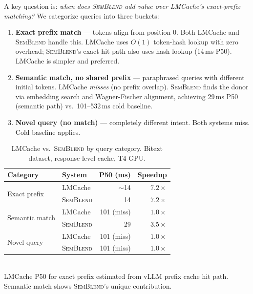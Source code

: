 \documentclass[11pt,twocolumn]{article}
\newcommand{\semblend}{\textsc{SemBlend}\xspace}
\begin{document}
A key question is: \emph{when does \semblend add value over LMCache's
exact-prefix matching?} We categorize queries into three buckets:

\begin{enumerate}[leftmargin=*,nosep]
\item \textbf{Exact prefix match} --- tokens align from position 0.
  Both LMCache and \semblend handle this. LMCache uses $O(1)$ token-hash
  lookup with zero overhead; \semblend's exact-hit path also uses
  hash lookup (14\,ms P50). LMCache is simpler and preferred.

\item \textbf{Semantic match, no shared prefix} --- paraphrased queries
  with different initial tokens. LMCache \emph{misses} (no prefix
  overlap). \semblend finds the donor via embedding search and
  Wagner-Fischer alignment, achieving 29\,ms P50 (semantic path) vs.\
  101--532\,ms cold baseline.

\item \textbf{Novel query (no match)} --- completely different intent.
  Both systems miss. Cold baseline applies.
\end{enumerate}

\begin{table}[t]
\centering
\caption{LMCache vs.\ \semblend by query category. Bitext dataset,
response-level cache, T4 GPU.}
\label{tab:lmcache}
\footnotesize
\setlength{\tabcolsep}{2.5pt}
\begin{tabular}{@{}llrr@{}}
\toprule
\textbf{Category} & \textbf{System} & \textbf{P50 (ms)} & \textbf{Speedup} \\
\midrule
\multirow{2}{*}{Exact prefix} & LMCache & $\sim$14 & $7.2\times$ \\
 & \semblend & 14 & $7.2\times$ \\
\midrule
\multirow{2}{*}{Semantic match} & LMCache & 101 (miss) & $1.0\times$ \\
 & \semblend & 29 & $3.5\times$ \\
\midrule
\multirow{2}{*}{Novel query} & LMCache & 101 (miss) & $1.0\times$ \\
 & \semblend & 101 (miss) & $1.0\times$ \\
\bottomrule
\end{tabular}\\[2pt]
{\footnotesize LMCache P50 for exact prefix estimated from vLLM prefix
cache hit path. Semantic match shows \semblend's unique contribution.}
\end{table}
\end{document}
